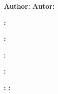 \large
\vspace{5cm}
\begin{center}

  \LARGE\textbf{\myDegreefull}

  \vspace{25mm}

  \LARGE\textbf{\myWorkTypeFull}

  \LARGE{\myBookTitle}

  \vspace{5cm}

  {
    \textbf{Author:}  \myAuthorFullName 
  }
  {
    \textbf{Autor:}  \myAuthorFullName 
  }

  \vspace{0.5cm}


  {
    {
      \textbf{\expandafter\makefirstuc\expandafter{\wordAdvisor}:} \myAcademicTutorFullName{}

      \ifthenelse{\equal{\myCoTutorFullName}{}}
      {
      }
      {
        \textbf{\expandafter\makefirstuc\expandafter{\wordCoAdvisor}:} \myCoTutorFullName{}
      }

    }
    {%
      \textbf{\expandafter\makefirstuc\expandafter{\wordTutorOrTutora}:}    \myAcademicTutorFullName{}

      \ifthenelse{\equal{\myCoTutorFullName}{}}
      {
      }
      {
        \textbf{\expandafter\makefirstuc\expandafter{\wordCoTutorOrCoTutora}:} \myCoTutorFullName{}
      }
    }
  }
  {
    {
      \textbf{\expandafter\makefirstuc\expandafter{\wordAdvisorOrAdvisors}:} \myAdvisors
    }
    {
      \textbf{\expandafter\makefirstuc\expandafter{\wordTutorOrTutores}:} \myAdvisors
    }
  }  




\end{center}

\begin{bottomparagraph}
  \begin{center}
    \huge{\myThesisDefenseYear}
  \end{center}
\end{bottomparagraph}

\clearemptydoublepage


